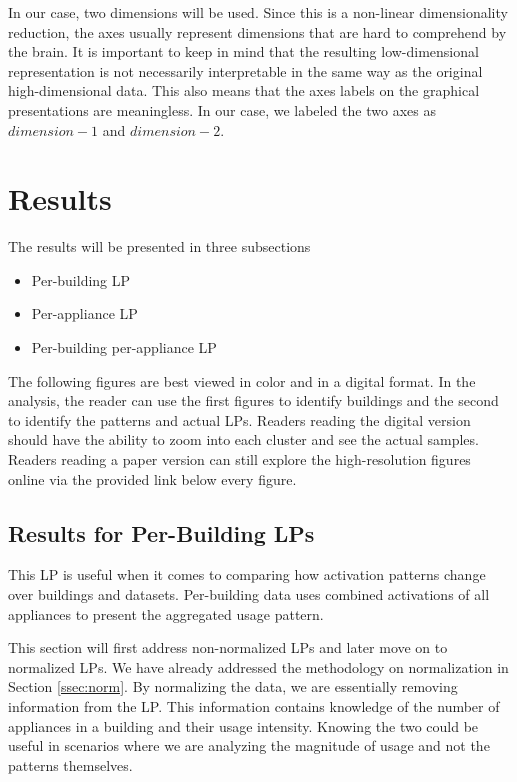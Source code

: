 In our case, two dimensions will be used. Since this is a non-linear dimensionality reduction, 
the axes usually represent dimensions that are hard to comprehend by the brain.
It is important to keep in mind that the resulting low-dimensional representation is not necessarily interpretable in the same way as the original high-dimensional data.
This also means that the axes labels on the graphical presentations are meaningless.
In our case, we labeled the two axes as $dimension-1$ and $dimension-2$.

\section{Results}

The results will be presented in three subsections

\begin{itemize}
	\item Per-building LP
	\item Per-appliance LP
	\item Per-building per-appliance LP
\end{itemize}


The following figures are best viewed in color and in a digital format.
In the analysis, the reader can use the first figures to identify buildings and the second to identify the patterns and actual LPs.
Readers reading the digital version should have the ability to zoom into each cluster and see the actual samples.
Readers reading a paper version can still explore the high-resolution figures online via the provided link below every figure.

\subsection{Results for Per-Building LPs}
\label{ssec:res_pb_lp}

This LP is useful when it comes to comparing how activation patterns change over buildings and datasets.
Per-building data uses combined activations of all appliances to present the aggregated usage pattern.

This section will first address non-normalized LPs and later move on to normalized LPs.
We have already addressed the methodology on normalization in Section \ref{ssec:norm}.
By normalizing the data, we are essentially removing information from the LP.
This information contains knowledge of the number of appliances in a building and their usage intensity.
Knowing the two could be useful in scenarios where we are analyzing the magnitude of usage and not the patterns themselves.

